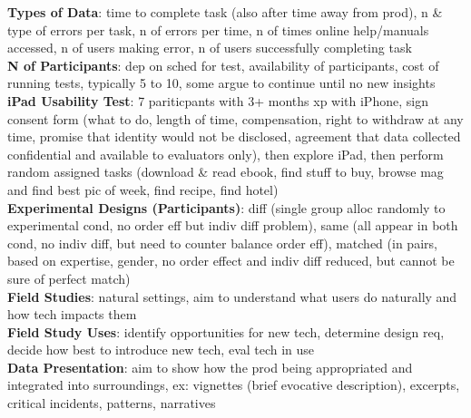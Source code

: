 \documentclass[a4paper]{article}
\begin{document}
\begin{multicols}{3}
        \textbf{Types of Data}: time to complete task (also after time away from prod), n \& type of errors per task, n of errors per time, n of times online help/manuals accessed, n of users making error, n of users successfully completing task\\
        \textbf{N of Participants}: dep on sched for test, availability of participants, cost of running tests, typically 5 to 10, some argue to continue until no new insights\\
        \textbf{iPad Usability Test}: 7 pariticpants with 3+ months xp with iPhone, sign consent form (what to do, length of time, compensation, right to withdraw at any time, promise that identity would not be disclosed, agreement that data collected confidential and available to evaluators only), then explore iPad, then perform random assigned tasks (download \& read ebook, find stuff to buy, browse mag and find best pic of week, find recipe, find hotel)\\
        \textbf{Experimental Designs (Participants)}: diff (single group alloc randomly to experimental cond, no order eff but indiv diff problem), same (all appear in both cond, no indiv diff, but need to counter balance order eff), matched (in pairs, based on expertise, gender, no order effect and indiv diff reduced, but cannot be sure of perfect match)\\
        \textbf{Field Studies}: natural settings, aim to understand what users do naturally and how tech impacts them\\
        \textbf{Field Study Uses}: identify opportunities for new tech, determine design req, decide how best to introduce new tech, eval tech in use\\
        \textbf{Data Presentation}: aim to show how the prod being appropriated and integrated into surroundings, ex: vignettes (brief evocative description), excerpts, critical incidents, patterns, narratives\\
    \end{multicols}
    
\end{document}
